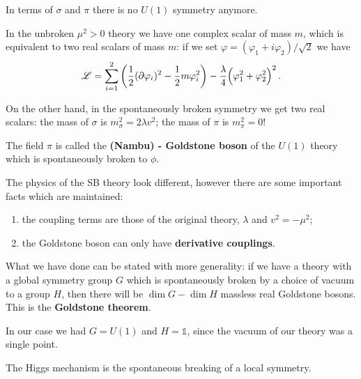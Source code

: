 \documentclass[main.tex]{subfiles}
\begin{document}
In terms of \(\sigma \) and \(\pi \) there is no \(U(1)\) symmetry anymore. 

In the unbroken \(\mu^2 > 0\) theory we have one complex scalar of mass \(m\), which is equivalent to two real scalars of mass \(m\): if we set \(\varphi = (\varphi_1 + i \varphi_2 ) / \sqrt{2}\) we have 
%
\begin{align}
\mathscr{L} = \sum _{i=1}^{2}\qty( \frac{1}{2} (\partial \varphi_{i} )^2 - \frac{1}{2} m \varphi_{i}^2 ) - \frac{\lambda }{4} \qty(\varphi_1^2 + \varphi_2^2)^2 
\,.
\end{align}

On the other hand, in the spontaneously broken symmetry we get two real scalars: the mass of \(\sigma \) is \(m_\sigma^2 =  2 \lambda v^2\); the mass of \(\pi \) is \(m_\pi^2 = 0\)!

The field \(\pi \) is called the \textbf{(Nambu) - Goldstone boson} of the \(U(1)\) theory which is spontaneously broken to \(\phi \). 


The physics of the SB theory look different, however there are some important facts which are maintained: 
\begin{enumerate}
    \item the coupling terms are those of the original theory, \(\lambda \) and \(v^2 = - \mu^2\);
    \item the Goldstone boson can only have \textbf{derivative couplings}.
\end{enumerate}

What we have done can be stated with more generality: if we have a theory with a global symmetry group \(G\) which is spontaneously broken by a choice of vacuum to a group \(H\), then there will be \(\dim G - \dim H\) massless real Goldstone bosons. 
This is the \textbf{Goldstone theorem}.

In our case we had \(G = U(1)\) and \(H = \mathbb{1}\), since the vacuum of our theory was a single point. 

The Higgs mechanism is the spontaneous breaking of a local symmetry. 
\end{document}
